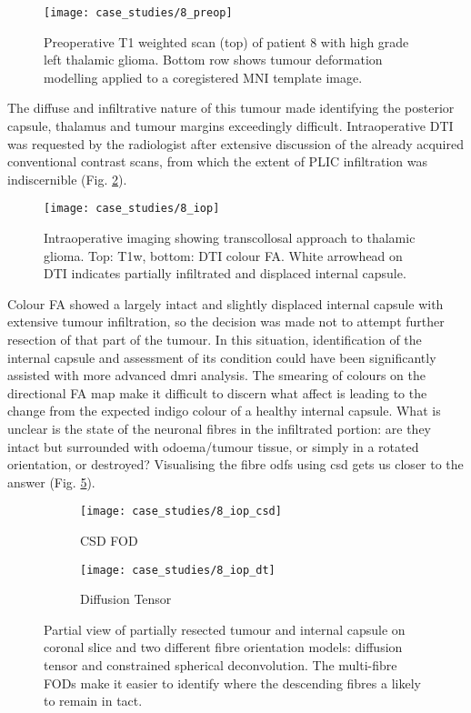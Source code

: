 \begin{figure}
  \centering
  \texttt{[image: case\_studies/8\_preop]}
  \caption{Preoperative T1 weighted scan (top) of patient 8 with high grade left thalamic glioma. Bottom row shows tumour deformation modelling applied to a coregistered MNI template image.}
  \label{fig:8p}
\end{figure}

The diffuse and infiltrative nature of this tumour made identifying the posterior capsule, thalamus and tumour margins exceedingly difficult.
Intraoperative DTI was requested by the radiologist after extensive discussion of the already acquired conventional contrast scans, from which the extent of PLIC infiltration was indiscernible (Fig. \ref{fig:8i}).

\begin{figure}
  \centering
  \texttt{[image: case\_studies/8\_iop]}
  \caption{Intraoperative imaging showing transcollosal approach to thalamic glioma. Top: T1w, bottom: DTI colour FA. White arrowhead on DTI indicates partially infiltrated and displaced internal capsule.}
  \label{fig:8i}
\end{figure}

Colour FA showed a largely intact and slightly displaced internal capsule with extensive tumour infiltration, so the decision was made not to attempt further resection of that part of the tumour.
In this situation, identification of the internal capsule and assessment of its condition could have been significantly assisted with more advanced \gls{dmri} analysis.
The smearing of colours on the directional FA map make it difficult to discern what affect is leading to the change from the expected indigo colour of a healthy internal capsule.
What is unclear is the state of the neuronal fibres in the infiltrated portion: are they intact but surrounded with odoema/tumour tissue, or simply in a rotated orientation, or destroyed?
Visualising the fibre \glspl{odf} using \gls{csd} gets us closer to the answer (Fig. \ref{fig:8i_fod}).

\begin{figure}
  \begin{subfigure}{0.45\textwidth}
    \centering
    \texttt{[image: case\_studies/8\_iop\_csd]}
    \caption{CSD FOD}
    \label{fig:8i_csd}
  \end{subfigure}%
  \begin{subfigure}{0.45\textwidth}
    \centering
    \texttt{[image: case\_studies/8\_iop\_dt]}
    \caption{Diffusion Tensor}
    \label{fig:8i_dt}
  \end{subfigure}
  \caption{Partial view of partially resected tumour and internal capsule on coronal slice and two different fibre orientation models: diffusion tensor and constrained spherical deconvolution. The multi-fibre FODs make it easier to identify where the descending fibres a likely to remain in tact.}
  \label{fig:8i_fod}
\end{figure}


